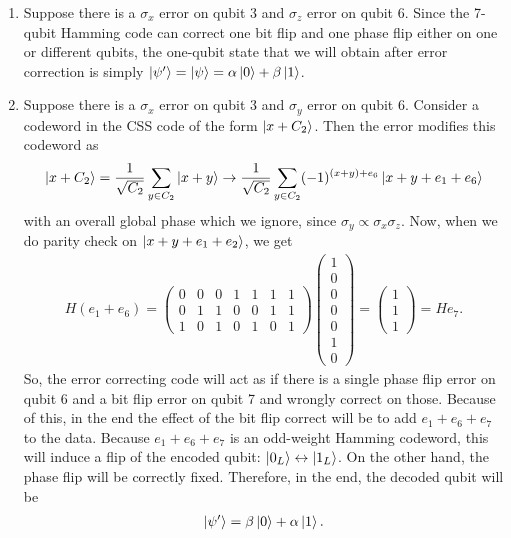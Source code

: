 \documentclass{article}
\theoremstyle{definition}
\newcommand{\al}{\alpha}
\newcommand{\be}{\beta}
\newcommand{\f}[2]{\frac{#1}{#2}}
\begin{document}
\begin{enumerate}[label=(\alph*)]
	\item Suppose there is a $\sigma_x$ error on qubit 3 and $\sigma_z$ error on qubit 6. Since the 7-qubit Hamming code can correct one bit flip and one phase flip either on one or different qubits, the one-qubit state that we will obtain after error correction is simply $\ket{\psi'} = \ket{\psi} = \al\ket{0} + \be\ket{1}$.
	
	\item Suppose there is a $\sigma_x$ error on qubit 3 and $\sigma_y$ error on qubit 6. Consider a codeword in the CSS code of the form $\ket{x+C_2}$. Then the error modifies this codeword as 
	\begin{align*}
		\ket{x+C_2} = \f{1}{\sqrt{C_2}} \sum_{y\in C_2} \ket{x+y} \to \f{1}{\sqrt{C_2}} \sum_{y\in C_2} (-1)^{(x+y)+e_6} \ket{x+y + e_1+e_6}
	\end{align*}
	with an overall global phase which we ignore, since $\sigma_y \propto \sigma_x\sigma_z$. Now, when we do parity check on $\ket{x+y+e_1+e_2}$, we get
	\begin{align*}
		H(e_1+e_6) = \begin{pmatrix}
			0 & 0 & 0 & 1 & 1 & 1 & 1\\
			0 & 1 & 1 & 0 & 0 & 1 & 1\\
			1 & 0 & 1 & 0 & 1 & 0 & 1 
		\end{pmatrix} \begin{pmatrix}
		1 \\ 0 \\ 0 \\ 0 \\ 0 \\ 1 \\ 0
	\end{pmatrix} = \begin{pmatrix}
	1 \\ 1 \\ 1
\end{pmatrix} = He_7.
	\end{align*}
So, the error correcting code will act as if there is a single phase flip error on qubit 6 and a bit flip error on qubit 7 and wrongly correct on those. Because of this, in the end the effect of the bit flip correct will be to add $e_1+e_6+e_7$ to the data. Because $e_1+e_6+e_7$ is an odd-weight Hamming codeword, this will induce a flip of the encoded qubit: $\ket{0_L} \leftrightarrow \ket{1_L}$. On the other hand, the phase flip will be correctly fixed. Therefore, in the end, the decoded qubit will be 
\begin{align*}
	\ket{\psi'} = \be\ket{0} +  \al \ket{1}.
\end{align*}
\end{enumerate}
\end{document}
